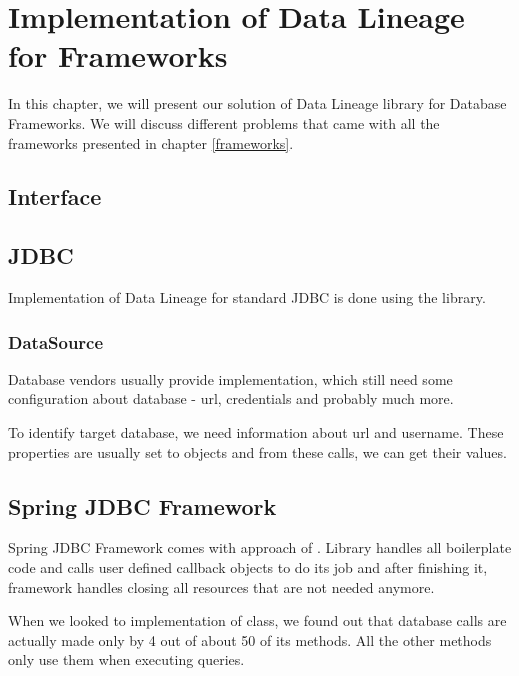 
\chapter{Implementation of Data Lineage for Frameworks}

In this chapter, we will present our solution of Data Lineage library for Database Frameworks.
We will discuss different problems that came with all the frameworks presented in chapter \ref{frameworks}.

\section{Interface}

\section{JDBC \label{implementation:jdbc}}

Implementation of Data Lineage for standard JDBC is done using the library.




\subsection{DataSource \label{implementation:dataSource}}

Database vendors usually provide  implementation, which still
need some configuration about database - url, credentials and probably much more.

To identify target database, we need information about url and username. These properties
are usually set to  objects and from these calls, we can get
their values.




\section{Spring JDBC Framework}

Spring JDBC Framework comes with approach of . Library handles
all boilerplate code and calls user defined callback objects to do its job
and after finishing it, framework handles closing all resources that are not needed anymore.

When we looked to implementation of  class, we found out
that database calls are actually made only by 4 out of about 50 of its methods.
All the other methods only use them when executing queries.



